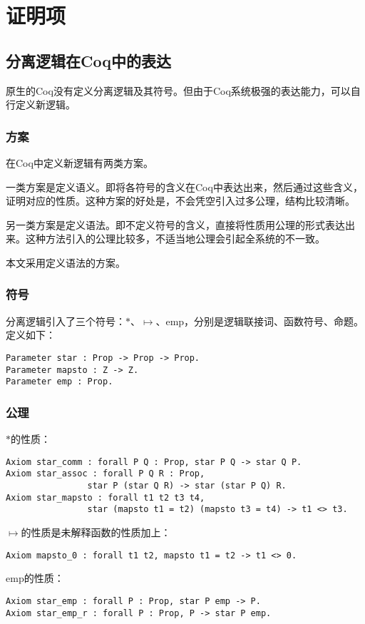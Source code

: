 \section{证明项}
\subsection{分离逻辑在Coq中的表达}
原生的Coq没有定义分离逻辑及其符号。但由于Coq系统极强的表达能力，可以自行定义新逻辑。

\subsubsection{方案}
在Coq中定义新逻辑有两类方案。

一类方案是定义语义。即将各符号的含义在Coq中表达出来，然后通过这些含义，证明对应的性质。这种方案的好处是，不会凭空引入过多公理，结构比较清晰。

另一类方案是定义语法。即不定义符号的含义，直接将性质用公理的形式表达出来。这种方法引入的公理比较多，不适当地公理会引起全系统的不一致。

本文采用定义语法的方案。

\subsubsection{符号}
分离逻辑引入了三个符号：$\ast$、$\mapsto$、$\mathrm{emp}$，分别是逻辑联接词、函数符号、命题。定义如下：
\begin{verbatim}
Parameter star : Prop -> Prop -> Prop.
Parameter mapsto : Z -> Z.
Parameter emp : Prop.
\end{verbatim}

\subsubsection{公理}
$\ast$的性质：
\begin{verbatim}
Axiom star_comm : forall P Q : Prop, star P Q -> star Q P.
Axiom star_assoc : forall P Q R : Prop,
                star P (star Q R) -> star (star P Q) R.
Axiom star_mapsto : forall t1 t2 t3 t4,
                star (mapsto t1 = t2) (mapsto t3 = t4) -> t1 <> t3.
\end{verbatim}

$\mapsto$的性质是未解释函数的性质加上：
\begin{verbatim}
Axiom mapsto_0 : forall t1 t2, mapsto t1 = t2 -> t1 <> 0.
\end{verbatim}

$\mathrm{emp}$的性质：
\begin{verbatim}
Axiom star_emp : forall P : Prop, star P emp -> P.
Axiom star_emp_r : forall P : Prop, P -> star P emp.
\end{verbatim}


